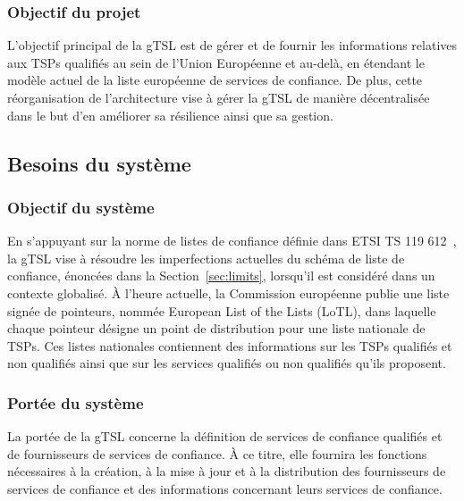 \documentclass{tnreport}
\begin{document}
\subsubsection{Objectif du projet}

L'objectif principal de la gTSL est de gérer et de fournir les informations relatives aux TSPs qualifiés au sein de l'Union Européenne et au-delà, en étendant le modèle actuel de la liste européenne de services de confiance. De plus, cette réorganisation de l'architecture vise à gérer la gTSL de manière décentralisée dans le but d'en améliorer sa résilience ainsi que sa gestion.

\subsection{Besoins du système}

\subsubsection{Objectif du système}

En s'appuyant sur la norme de listes de confiance définie dans ETSI TS 119 612~\cite{ETSITS119612}, la gTSL vise à résoudre les imperfections actuelles du schéma de liste de confiance, énoncées dans la Section~\ref{sec:limits}, lorsqu'il est considéré dans un contexte globalisé. 
À l'heure actuelle, la Commission européenne publie une liste signée de pointeurs, nommée European List of the Lists (LoTL), dans laquelle chaque pointeur désigne un point de distribution pour une liste nationale de TSPs. 
Ces listes nationales contiennent des informations sur les TSPs qualifiés et non qualifiés ainsi que sur les services qualifiés ou non qualifiés qu'ils proposent.

\subsubsection{Portée du système}

La portée de la gTSL concerne la définition de services de confiance qualifiés et de fournisseurs de services de confiance.
À ce titre, elle fournira les fonctions nécessaires à la création, à la mise à jour et à la distribution des fournisseurs de services de confiance et des informations concernant leurs services de confiance.
\end{document}
